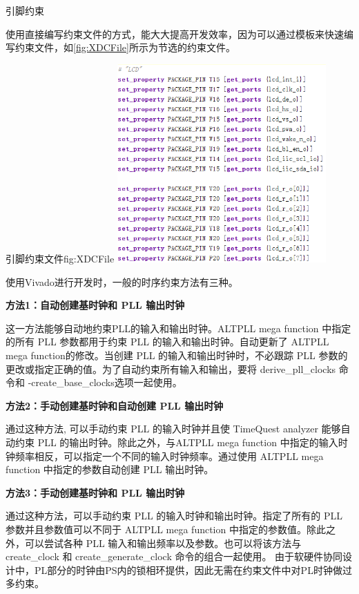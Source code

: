 \documentclass[supercite]{HustGraduPaper}
\begin{document}
引脚约束

使用直接编写约束文件的方式，能大大提高开发效率，因为可以通过模板来快速编写约束文件，如\autoref{fig:XDCFile}所示为节选的约束文件。

\begin{generalfig}[htb]{引脚约束文件}{fig:XDCFile}
	\includegraphics[width=8cm]{Figures/XDCFile.png}
\end{generalfig}


使用Vivado进行开发时，一般的时序约束方法有三种。

{\songti \bfseries 方法1：自动创建基时钟和 PLL 输出时钟}


这一方法能够自动地约束PLL的输入和输出时钟。ALTPLL mega function 中指定的所有 PLL 参数都用于约束 PLL 的输入和输出时钟。自动更新了 ALTPLL mega function的修改。当创建 PLL 的输入和输出时钟时，不必跟踪 PLL 参数的更改或指定正确的值。为了自动约束所有输入和输出，要将 derive\_pll\_clocks 命令和 -create\_base\_clocks选项一起使用。

{\songti \bfseries 方法2：手动创建基时钟和自动创建 PLL 输出时钟}


通过这种方法, 可以手动约束 PLL 的输入时钟并且使 TimeQuest analyzer 能够自动约束 PLL 的输出时钟。除此之外，与ALTPLL mega function 中指定的输入时钟频率相反，可以指定一个不同的输入时钟频率。通过使用 ALTPLL mega function 中指定的参数自动创建 PLL 输出时钟。

{\songti \bfseries 方法3：手动创建基时钟和 PLL 输出时钟}


通过这种方法，可以手动约束 PLL 的输入时钟和输出时钟。指定了所有的 PLL 参数并且参数值可以不同于 ALTPLL mega function 中指定的参数值。除此之外，可以尝试各种 PLL 输入和输出频率以及参数。也可以将该方法与 create\_clock 和 create\_generate\_clock 命令的组合一起使用。
由于软硬件协同设计中，PL部分的时钟由PS内的锁相环提供，因此无需在约束文件中对PL时钟做过多约束。
\end{document}
